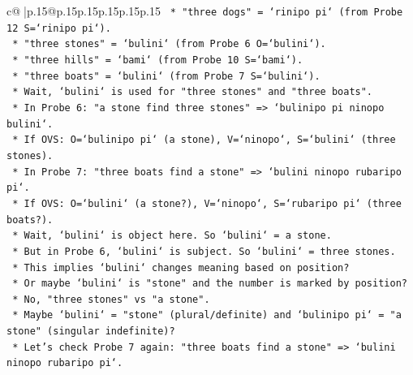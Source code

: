 \documentclass{article}
\begin{document}
{\begin{supertabular}{c@{$\;$}|p{.15\linewidth}@{}p{.15\linewidth}p{.15\linewidth}p{.15\linewidth}p{.15\linewidth}p{.15\linewidth}}
{{{\texttt{                                        *   "three dogs" = `rinipo pi` (from Probe 12 S=`rinipo pi`).} \\
\texttt{                                        *   "three stones" = `bulini` (from Probe 6 O=`bulini`).} \\
\texttt{                                        *   "three hills" = `bami` (from Probe 10 S=`bami`).} \\
\texttt{                                        *   "three boats" = `bulini` (from Probe 7 S=`bulini`).} \\
\texttt{                                            *   Wait, `bulini` is used for "three stones" and "three boats".} \\
\texttt{                                            *   In Probe 6: "a stone find three stones" => `bulinipo pi ninopo bulini`.} \\
\texttt{                                                *   If OVS: O=`bulinipo pi` (a stone), V=`ninopo`, S=`bulini` (three stones).} \\
\texttt{                                            *   In Probe 7: "three boats find a stone" => `bulini ninopo rubaripo pi`.} \\
\texttt{                                                *   If OVS: O=`bulini` (a stone?), V=`ninopo`, S=`rubaripo pi` (three boats?).} \\
\texttt{                                                *   Wait, `bulini` is object here. So `bulini` = a stone.} \\
\texttt{                                                *   But in Probe 6, `bulini` is subject. So `bulini` = three stones.} \\
\texttt{                                                *   This implies `bulini` changes meaning based on position?} \\
\texttt{                                                *   Or maybe `bulini` is "stone" and the number is marked by position?} \\
\texttt{                                                *   No, "three stones" vs "a stone".} \\
\texttt{                                                *   Maybe `bulini` = "stone" (plural/definite) and `bulinipo pi` = "a stone" (singular indefinite)?} \\
\texttt{                                                *   Let's check Probe 7 again: "three boats find a stone" => `bulini ninopo rubaripo pi`.} \\
}}}
\end{supertabular}}
\end{document}
